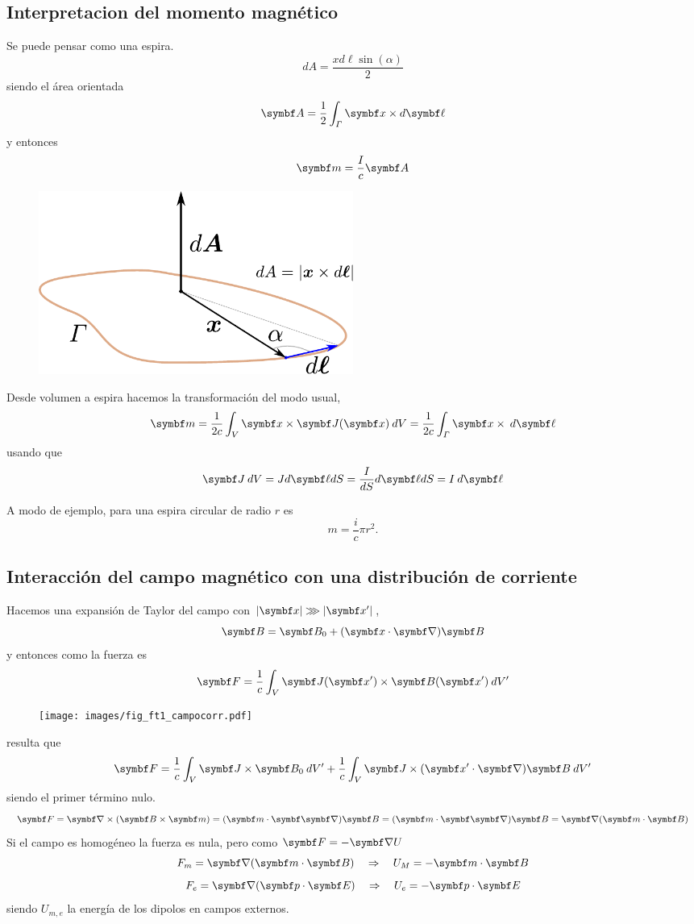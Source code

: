 \documentclass[10pt,oneside]{CBFT_book}
\begin{document}
\subsection{Interpretacion del momento magnético}

Se puede pensar  como una espira.
\[
	dA = \frac{ x d\ell \sin(\alpha) }{2}
\]
siendo el área orientada
\[
	\vb{A} = \frac{1}{2} \int_\Gamma \vb{x}\times d\vb{\ell} 
\]
y entonces
\[
	\vb{m} = \frac{I}{c}\vb{A}
\]
\begin{figure}[htb]
	\begin{center}
	\includegraphics[width=0.5\textwidth]{images/fig_ft1_mmag.pdf}	 
	\end{center}
	\caption{}
\end{figure}

Desde volumen a espira hacemos la transformación del modo usual,
\[
	\vb{m} = \frac{1}{2c} \int_V  \vb{x} \times \vb{J}(\vb{x})  \:dV =
		\frac{1}{2c} \int_\Gamma  \vb{x} \times \:d\vb{\ell}
\]
usando que
\[
	\vb{J} \: dV = J d\vb{\ell} dS = \frac{I}{dS} d\vb{\ell} dS = I \: d\vb{\ell} 
\]

A modo de ejemplo, para una espira circular de radio $r$ es
\[
	m = \frac{i}{c} \pi r^2.
\]

\subsection{Interacción del campo magnético con una distribución de corriente}

Hacemos una expansión de Taylor del campo  con $|\vb{x}|\ggg|\vb{x}'|$,
\[
	\vb{B} = \vb{B}_0 + (\vb{x}\cdot\Nabla)\vb{B}
\]
y entonces como la fuerza es
\[
	\vb{F} = \frac{1}{c} \int_V \vb{J}(\vb{x}') \times \vb{B}(\vb{x}') \: dV'
\]
\begin{figure}[htb]
	\begin{center}
	\texttt{[image: images/fig\_ft1\_campocorr.pdf]}	 
	\end{center}
	\caption{}
\end{figure}
resulta que
\[
	\vb{F} =  \frac{1}{c} \int_V \vb{J} \times \vb{B}_0 \: dV' +
		\frac{1}{c} \int_V \vb{J} \times (\vb{x}'\cdot\Nabla)\vb{B} \: dV'
\]
siendo el primer término nulo.
\[
	\vb{F} = \Nabla\times(\pv{B}{m}) = (\pe{m}{\Nabla})\vb{B} =
		(\pe{m}{\Nabla})\vb{B} = \Nabla(\pe{m}{B})
\]
Si el campo es homogéneo la fuerza es nula, pero como $\vb{F} = -\Nabla U$
\[
	F_m = \Nabla(\pe{m}{B}) \quad \Rightarrow \quad U_M = -\pe{m}{B}
\]
\[
	F_e = \Nabla(\pe{p}{E}) \quad \Rightarrow \quad U_e = -\pe{p}{E}
\]
siendo $U_{m,e}$ la energía de los dipolos en campos externos.
\end{document}
